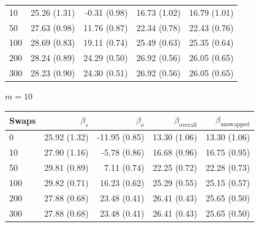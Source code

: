 \begin{table}[H]
\begin{tabular}{l rrrr}
10 & 25.26 (1.31) & -0.31 (0.98) & 16.73 (1.02) & 16.79 (1.01) \\
50 & 27.63 (0.98) & 11.76 (0.87) & 22.34 (0.78) & 22.43 (0.76) \\
100 & 28.69 (0.83) & 19.11 (0.74) & 25.49 (0.63) & 25.35 (0.64) \\
200 & 28.24 (0.89) & 24.29 (0.50) & 26.92 (0.56) & 26.05 (0.65) \\
300 & 28.23 (0.90) & 24.30 (0.51) & 26.92 (0.56) & 26.05 (0.65) \\
\bottomrule
\end{tabular}
\par\medskip
\noindent\textit{$m = 10$}\\[2pt]
\begin{tabular}{l rrrr}
\toprule
Swaps & $\beta_s$ & $\beta_o$ & $\beta_{\mathrm{overall}}$ & $\beta_{\mathrm{unswapped}}$ \\
\midrule
0 & 25.92 (1.32) & -11.95 (0.85) & 13.30 (1.06) & 13.30 (1.06) \\
10 & 27.90 (1.16) & -5.78 (0.86) & 16.68 (0.96) & 16.75 (0.95) \\
50 & 29.81 (0.89) & 7.11 (0.74) & 22.25 (0.72) & 22.28 (0.73) \\
100 & 29.82 (0.71) & 16.23 (0.62) & 25.29 (0.55) & 25.15 (0.57) \\
200 & 27.88 (0.68) & 23.48 (0.41) & 26.41 (0.43) & 25.65 (0.50) \\
300 & 27.88 (0.68) & 23.48 (0.41) & 26.41 (0.43) & 25.65 (0.50) \\
\bottomrule
\end{tabular}
\end{table}

